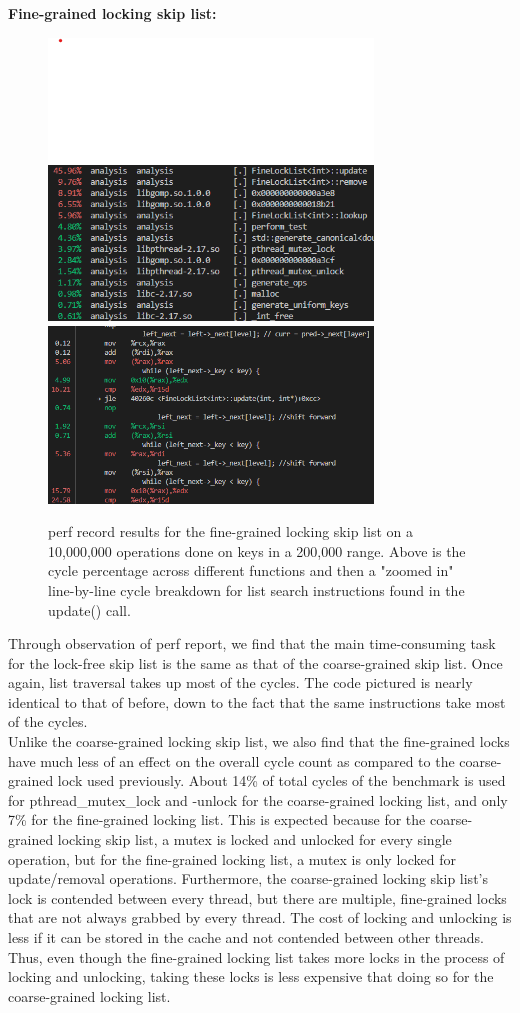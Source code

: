 \documentclass[11pt]{article}
\begin{document}
\textbf{Fine-grained locking skip list:}
\begin{figure}[h!]
\includegraphics[width=3.4in]{ex1_s1_overall_cycles.png}
\includegraphics[width=3.4in]{ex1_s1_cycles.png} \\
\caption{perf record results for the fine-grained locking skip list on a 10,000,000 operations done on keys in a 200,000 range. Above is the cycle percentage across different functions and then a "zoomed in" line-by-line cycle breakdown for list search instructions found in the update() call.}
\end{figure}

Through observation of perf report, we find that the main time-consuming task for the lock-free skip list is the same as that of the coarse-grained skip list. Once again, list traversal takes up most of the cycles. The code pictured is nearly identical to that of before, down to the fact that the same instructions take most of the cycles. \\
Unlike the coarse-grained locking skip list, we also find that the fine-grained locks have much less of an effect on the overall cycle count as compared to the coarse-grained lock used previously. About 14\% of total cycles of the benchmark is used for pthread\_mutex\_lock and -unlock for the coarse-grained locking list, and only 7\% for the fine-grained locking list. This is expected because for the coarse-grained locking skip list, a mutex is locked and unlocked for every single operation, but for the fine-grained locking list, a mutex is only locked for update/removal operations. Furthermore, the coarse-grained locking skip list's lock is contended between every thread, but there are multiple, fine-grained locks that are not always grabbed by every thread. The cost of locking and unlocking is less if it can be stored in the cache and not contended between other threads. Thus, even though the fine-grained locking list takes more locks in the process of locking and unlocking, taking these locks is less expensive that doing so for the coarse-grained locking list. 
\end{document}
